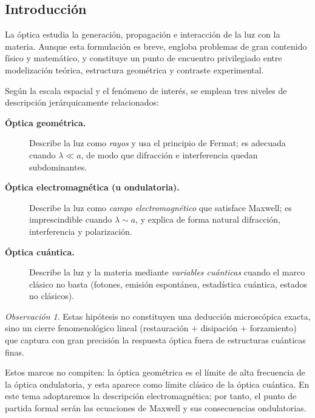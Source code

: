 \documentclass[12pt, a4paper]{article}
\theoremstyle{plain}
\theoremstyle{definition}
\theoremstyle{remark}
\newtheorem*{observacion}{Observación}
\begin{document}
\subsection{Introducción}

La óptica estudia la generación, propagación e interacción de la luz con la
materia. Aunque esta formulación es breve, engloba problemas de gran contenido
físico y matemático, y constituye un punto de encuentro privilegiado entre
modelización teórica, estructura geométrica y contraste experimental.

Según la escala espacial y el fenómeno de interés, se emplean tres niveles de
descripción jerárquicamente relacionados:

\begin{description}
  \item[\textbf{Óptica geométrica.}] Describe la luz como \emph{rayos} y usa el
        principio de Fermat; es adecuada cuando $\lambda \ll a$, de modo que
        difracción e interferencia quedan subdominantes.

  \item[\textbf{Óptica electromagnética (u ondulatoria).}] Describe la luz como
        \emph{campo electromagnético} que satisface Maxwell; es imprescindible
        cuando $\lambda \sim a$, y explica de forma natural difracción,
        interferencia y polarización.

  \item[\textbf{Óptica cuántica.}] Describe la luz y la materia mediante
        \emph{variables cuánticas} cuando el marco clásico no basta (fotones,
        emisión espontánea, estadística cuántica, estados no clásicos).
\end{description}

\begin{observacion}
Estas hipótesis no constituyen una deducción microscópica exacta, sino un
cierre fenomenológico lineal (restauración + disipación + forzamiento) que
captura con gran precisión la respuesta óptica fuera de estructuras cuánticas
finas.
\end{observacion}

Estos marcos no compiten: la óptica geométrica es el límite de alta frecuencia
de la óptica ondulatoria, y esta aparece como límite clásico de la óptica
cuántica. En este tema adoptaremos la descripción electromagnética; por tanto,
el punto de partida formal serán las ecuaciones de Maxwell y sus consecuencias
ondulatorias.

\end{document}
